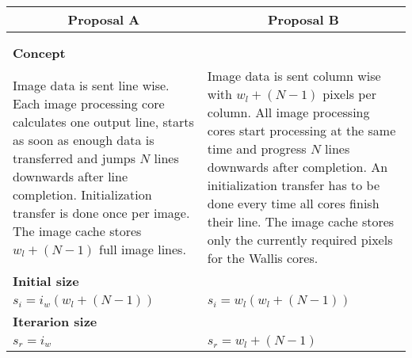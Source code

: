 \begin{table}[h!]
    \centering
    \begin{tabular}{p{} p{}}
        \toprule
        \multicolumn{1}{c}{Proposal A} & \multicolumn{1}{c}{Proposal B} \\
        \midrule
        \multicolumn{1}{c}{
            \begin{adjustbox}{scale=0.7}
                
            \end{adjustbox}}
        & 
        \multicolumn{1}{c}{
            \begin{adjustbox}{scale=0.7}
                
            \end{adjustbox}}
        \\
        \multicolumn{2}{c}{
            \begin{adjustbox}{max width=0.6\textwidth}
                
            \end{adjustbox}
        }
        \\\midrule
        \textbf{Concept} & \\
        Image data is sent line wise. Each image processing core calculates one
        output line, starts as soon as enough data is transferred and jumps $N$ lines
        downwards after line completion. Initialization transfer is done once
        per image. The image cache stores $w_l+(N-1)$ full image lines.
        &
        Image data is sent column wise with $w_l+(N-1)$ pixels per column. All
        image processing cores start processing at the same time and progress
        $N$ lines downwards after completion. An initialization transfer has to be done
        every time all cores finish their line. The image cache stores only the currently required
        pixels for the Wallis cores.
        \\\midrule
        \textbf{Initial size} & \\
        {\( 
            s_i = i_w(w_l+(N-1))
        \)}
        &
        {\( 
            s_i = w_l(w_l+(N-1))
        \)}
        \\\midrule
        \textbf{Iterarion size} & \\
        {\( 
            s_r  = i_w
        \)}
        &
        {\( 
            s_r  = w_l+(N-1)
        \)}
        \\\midrule

\end{tabular}
\end{table}

